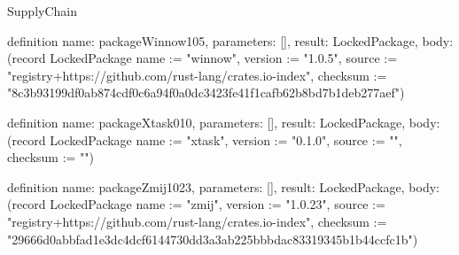\begin{lexlean}{SupplyChain}
\begin{semanticmodule}
definition{
  name: packageWinnow105,
  parameters: [],
  result: LockedPackage,
  body: (record LockedPackage {name := "winnow", version := "1.0.5", source := "registry+https://github.com/rust-lang/crates.io-index", checksum := "8c3b93199df0ab874cdf0c6a94f0a0dc3423fe41f1cafb62b8bd7b1deb277aef"})
}

definition{
  name: packageXtask010,
  parameters: [],
  result: LockedPackage,
  body: (record LockedPackage {name := "xtask", version := "0.1.0", source := "", checksum := ""})
}

definition{
  name: packageZmij1023,
  parameters: [],
  result: LockedPackage,
  body: (record LockedPackage {name := "zmij", version := "1.0.23", source := "registry+https://github.com/rust-lang/crates.io-index", checksum := "29666d0abbfad1e3dc4dcf6144730dd3a3ab225bbbdac83319345b1b44ccfc1b"})
}
\end{semanticmodule}
\end{lexlean}
